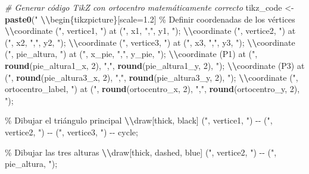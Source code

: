 \documentclass[
]{article}
\newenvironment{Shaded}{\begin{snugshade}}{\end{snugshade}}
\newcommand{\CommentTok}[1]{\textcolor[rgb]{0.56,0.35,0.01}{\textit{#1}}}
\newcommand{\DecValTok}[1]{\textcolor[rgb]{0.00,0.00,0.81}{#1}}
\newcommand{\FunctionTok}[1]{\textcolor[rgb]{0.13,0.29,0.53}{\textbf{#1}}}
\newcommand{\NormalTok}[1]{#1}
\newcommand{\OtherTok}[1]{\textcolor[rgb]{0.56,0.35,0.01}{#1}}
\newcommand{\SpecialCharTok}[1]{\textcolor[rgb]{0.81,0.36,0.00}{\textbf{#1}}}
\newcommand{\StringTok}[1]{\textcolor[rgb]{0.31,0.60,0.02}{#1}}
\begin{document}
\begin{Shaded}
\begin{Highlighting}[]
\CommentTok{\# Generar código TikZ con ortocentro matemáticamente correcto}
\NormalTok{tikz\_code }\OtherTok{\textless{}{-}} \FunctionTok{paste0}\NormalTok{(}\StringTok{"}
\SpecialCharTok{\textbackslash{}\textbackslash{}}\StringTok{begin\{tikzpicture\}[scale=1.2]}
\StringTok{  \% Definir coordenadas de los vértices}
\StringTok{  }\SpecialCharTok{\textbackslash{}\textbackslash{}}\StringTok{coordinate ("}\NormalTok{, vertice1, }\StringTok{") at ("}\NormalTok{, x1, }\StringTok{","}\NormalTok{, y1, }\StringTok{");}
\StringTok{  }\SpecialCharTok{\textbackslash{}\textbackslash{}}\StringTok{coordinate ("}\NormalTok{, vertice2, }\StringTok{") at ("}\NormalTok{, x2, }\StringTok{","}\NormalTok{, y2, }\StringTok{");}
\StringTok{  }\SpecialCharTok{\textbackslash{}\textbackslash{}}\StringTok{coordinate ("}\NormalTok{, vertice3, }\StringTok{") at ("}\NormalTok{, x3, }\StringTok{","}\NormalTok{, y3, }\StringTok{");}
\StringTok{  }\SpecialCharTok{\textbackslash{}\textbackslash{}}\StringTok{coordinate ("}\NormalTok{, pie\_altura, }\StringTok{") at ("}\NormalTok{, x\_pie, }\StringTok{","}\NormalTok{, y\_pie, }\StringTok{");}
\StringTok{  }\SpecialCharTok{\textbackslash{}\textbackslash{}}\StringTok{coordinate (P1) at ("}\NormalTok{, }\FunctionTok{round}\NormalTok{(pie\_altura1\_x, }\DecValTok{2}\NormalTok{), }\StringTok{","}\NormalTok{, }\FunctionTok{round}\NormalTok{(pie\_altura1\_y, }\DecValTok{2}\NormalTok{), }\StringTok{");}
\StringTok{  }\SpecialCharTok{\textbackslash{}\textbackslash{}}\StringTok{coordinate (P3) at ("}\NormalTok{, }\FunctionTok{round}\NormalTok{(pie\_altura3\_x, }\DecValTok{2}\NormalTok{), }\StringTok{","}\NormalTok{, }\FunctionTok{round}\NormalTok{(pie\_altura3\_y, }\DecValTok{2}\NormalTok{), }\StringTok{");}
\StringTok{  }\SpecialCharTok{\textbackslash{}\textbackslash{}}\StringTok{coordinate ("}\NormalTok{, ortocentro\_label, }\StringTok{") at ("}\NormalTok{, }\FunctionTok{round}\NormalTok{(ortocentro\_x, }\DecValTok{2}\NormalTok{), }\StringTok{","}\NormalTok{, }\FunctionTok{round}\NormalTok{(ortocentro\_y, }\DecValTok{2}\NormalTok{), }\StringTok{");}

\StringTok{  \% Dibujar el triángulo principal}
\StringTok{  }\SpecialCharTok{\textbackslash{}\textbackslash{}}\StringTok{draw[thick, black]}
\StringTok{    ("}\NormalTok{, vertice1, }\StringTok{") {-}{-} ("}\NormalTok{, vertice2, }\StringTok{") {-}{-} ("}\NormalTok{, vertice3, }\StringTok{") {-}{-} cycle;}

\StringTok{  \% Dibujar las tres alturas}
\StringTok{  }\SpecialCharTok{\textbackslash{}\textbackslash{}}\StringTok{draw[thick, dashed, blue]}
\StringTok{    ("}\NormalTok{, vertice2, }\StringTok{") {-}{-} ("}\NormalTok{, pie\_altura, }\StringTok{");}


\end{Highlighting}
\end{Shaded}
\end{document}
